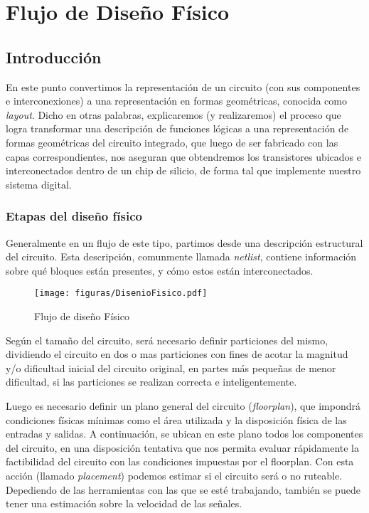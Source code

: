 \chapter{Flujo de Diseño Físico}
\section{Introducción}

En este punto convertimos la representación de un circuito (con sus componentes e interconexiones) a una representación en formas geométricas, conocida como \emph{layout}. Dicho en otras palabras, explicaremos (y realizaremos) el proceso que logra transformar una descripción de funciones lógicas a una representación de formas geométricas del circuito integrado, que luego de ser fabricado con las capas correspondientes, nos aseguran que obtendremos los transistores ubicados e interconectados dentro de un chip de silicio, de forma tal que implemente nuestro sistema digital.

\subsection{Etapas del diseño físico}
Generalmente en un flujo de este tipo, partimos desde una descripción estructural del circuito. Esta descripción, comunmente llamada \emph{netlist}, contiene información sobre qué bloques están presentes, y cómo estos están interconectados.

\begin{figure}[h]
\centering
\texttt{[image: figuras/DisenioFisico.pdf]}
  \caption{Flujo de diseño Físico}
  \label{fig:diseñoFísico}
\end{figure}




Según el tamaño del circuito, será necesario definir particiones del mismo, dividiendo el circuito en dos o mas particiones con fines de acotar la magnitud y/o dificultad inicial del circuito original, en partes más pequeñas de menor dificultad, si las particiones se realizan correcta e inteligentemente. 

Luego es necesario definir un plano general del circuito (\emph{floorplan}), que impondrá condiciones físicas mínimas como el área utilizada y la disposición física de las entradas y salidas.
A continuación, se ubican en este plano todos los componentes del circuito, en una disposición tentativa que nos permita evaluar rápidamente la factibilidad del circuito con las condiciones impuestas por el floorplan. Con esta acción (llamado \emph{placement}) podemos estimar si el circuito será o no ruteable. Depediendo de las herramientas con las que se esté trabajando, también se puede tener una estimación sobre la velocidad de las señales. 

